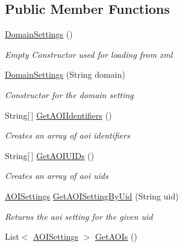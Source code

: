 \subsection*{Public Member Functions}
\begin{DoxyCompactItemize}
\item 
\hyperlink{class_web_analyzer_1_1_models_1_1_settings_model_1_1_domain_settings_a8ffad3f7b78462d687db4f95dd484953}{Domain\+Settings} ()
\begin{DoxyCompactList}\small\item\em Empty Constructor used for loading from xml \end{DoxyCompactList}\item 
\hyperlink{class_web_analyzer_1_1_models_1_1_settings_model_1_1_domain_settings_af6797984cc6e12c59f276558864db719}{Domain\+Settings} (String domain)
\begin{DoxyCompactList}\small\item\em Constructor for the domain setting \end{DoxyCompactList}\item 
String\mbox{[}$\,$\mbox{]} \hyperlink{class_web_analyzer_1_1_models_1_1_settings_model_1_1_domain_settings_a7ff89407de4e9ea34dc9535194dc3ca5}{Get\+A\+O\+I\+Identifiers} ()
\begin{DoxyCompactList}\small\item\em Creates an array of aoi identifiers \end{DoxyCompactList}\item 
String\mbox{[}$\,$\mbox{]} \hyperlink{class_web_analyzer_1_1_models_1_1_settings_model_1_1_domain_settings_a29e5b2dc3e3a0476dc5822615a949e21}{Get\+A\+O\+I\+U\+I\+Ds} ()
\begin{DoxyCompactList}\small\item\em Creates an array of aoi uids \end{DoxyCompactList}\item 
\hyperlink{class_web_analyzer_1_1_models_1_1_settings_model_1_1_a_o_i_settings}{A\+O\+I\+Settings} \hyperlink{class_web_analyzer_1_1_models_1_1_settings_model_1_1_domain_settings_a5cd076f8ac19ba306443c66ea0a032a7}{Get\+A\+O\+I\+Setting\+By\+Uid} (String uid)
\begin{DoxyCompactList}\small\item\em Returns the aoi setting for the given uid \end{DoxyCompactList}\item 
List$<$ \hyperlink{class_web_analyzer_1_1_models_1_1_settings_model_1_1_a_o_i_settings}{A\+O\+I\+Settings} $>$ \hyperlink{class_web_analyzer_1_1_models_1_1_settings_model_1_1_domain_settings_ab1d25299b3a24bad81acc44b1994f342}{Get\+A\+O\+Is} ()

\end{DoxyCompactItemize}
